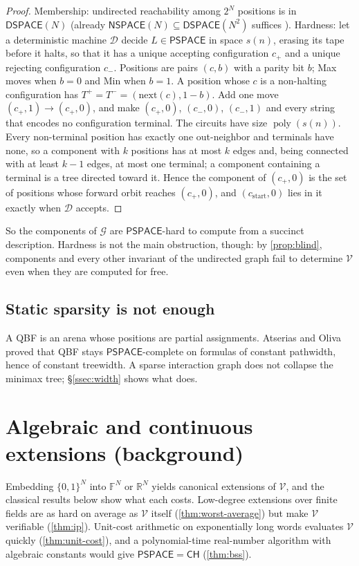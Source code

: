 \documentclass[final]{siamart0516}
\numberwithin{theorem}{section}
\numberwithin{equation}{section}
\theoremstyle{siamnonum}
\theoremstyle{plain}
\newcommand{\RR}{\mathbb{R}}
\newcommand{\FF}{\mathbb{F}}
\newcommand{\val}{\mathcal{V}}            %
\newcommand{\SG}{\mathcal{G}}             %
\newcommand{\poly}{\operatorname{poly}}
\newcommand{\cls}[1]{\mathsf{#1}}
\newcommand{\PSPACE}{\cls{PSPACE}}
\newcommand{\CH}{\cls{CH}}
\begin{document}
\begin{proof}
Membership: undirected reachability among $2^N$ positions is in $\mathsf{DSPACE}(N)$ \cite{Reingold} (already $\mathsf{NSPACE}(N)\subseteq\mathsf{DSPACE}(N^2)$ suffices \cite{Savitch}). Hardness: let a deterministic machine $\mathcal D$ decide $L\in\PSPACE$ in space $s(n)$, erasing its tape before it halts, so that it has a unique accepting configuration $c_{+}$ and a unique rejecting configuration $c_{-}$. Positions are pairs $(c,b)$ with a parity bit $b$; Max moves when $b=0$ and Min when $b=1$. A position whose $c$ is a non-halting configuration has $T^{+}=T^{-}=(\mathrm{next}(c),1-b)$. Add one move $(c_{+},1)\to(c_{+},0)$, and make $(c_{+},0)$, $(c_{-},0)$, $(c_{-},1)$ and every string that encodes no configuration terminal. The circuits have size $\poly(s(n))$. Every non-terminal position has exactly one out-neighbor and terminals have none, so a component with $k$ positions has at most $k$ edges and, being connected with at least $k-1$ edges, at most one terminal; a component containing a terminal is a tree directed toward it. Hence the component of $(c_{+},0)$ is the set of positions whose forward orbit reaches $(c_{+},0)$, and $(c_{\mathrm{start}},0)$ lies in it exactly when $\mathcal D$ accepts.
\end{proof}

So the components of $\SG$ are $\PSPACE$-hard to compute from a succinct description. Hardness is not the main obstruction, though: by \cref{prop:blind}, components and every other invariant of the undirected graph fail to determine $\val$ even when they are computed for free.

\subsection{Static sparsity is not enough}
A QBF is an arena whose positions are partial assignments. Atserias and Oliva \cite{AtseriasOliva} proved that QBF stays $\PSPACE$-complete on formulas of constant pathwidth, hence of constant treewidth. A sparse interaction graph does not collapse the minimax tree; \S\ref{ssec:width} shows what does.

\section{Algebraic and continuous extensions (background)}\label{sec:extensions}

Embedding $\{0,1\}^N$ into $\FF^N$ or $\RR^N$ yields canonical extensions of $\val$, and the classical results below show what each costs. Low-degree extensions over finite fields are as hard on average as $\val$ itself (\cref{thm:worst-average}) but make $\val$ verifiable (\cref{thm:ip}). Unit-cost arithmetic on exponentially long words evaluates $\val$ quickly (\cref{thm:unit-cost}), and a polynomial-time real-number algorithm with algebraic constants would give $\PSPACE=\CH$ (\cref{thm:bss}).
\end{document}

